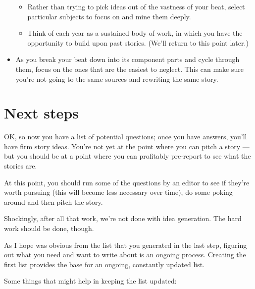 \documentclass[
  11pt,
  american,
  letterpaperpaper,
  extrafontsizes,onecolumn,openright
  ]{memoir}
\providecommand{\tightlist}{%
  \setlength{\itemsep}{0pt}\setlength{\parskip}{0pt}}
\begin{document}
\begin{itemize}
  \begin{itemize}
  \tightlist
  \item
    Rather than trying to pick ideas out of the vastness of your beat, select particular subjects to focus on and mine them deeply.
  \item
    Think of each year as a sustained body of work, in which you have the opportunity to build upon past stories. (We'll return to this point later.)
  \end{itemize}
\item
  As you break your beat down into its component parts and cycle through them, focus on the ones that are the easiest to neglect. This can make sure you're not going to the same sources and rewriting the same story.
\end{itemize}

\hypertarget{next-steps-1}{%
\section*{Next steps}\label{next-steps-1}}

OK, so now you have a list of potential questions; once you have answers, you'll have firm story ideas. You're not yet at the point where you can pitch a story --- but you should be at a point where you can profitably pre-report to see what the stories are.

At this point, you should run some of the questions by an editor to see if they're worth pursuing (this will become less necessary over time), do some poking around and then pitch the story.

Shockingly, after all that work, we're not done with idea generation. The hard work should be done, though.

As I hope was obvious from the list that you generated in the last step, figuring out what you need and want to write about is an ongoing process. Creating the first list provides the base for an ongoing, constantly updated list.

Some things that might help in keeping the list updated:
\end{document}
